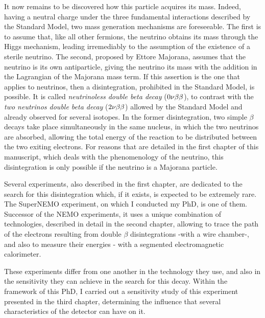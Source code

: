 It now remains to be discovered how this particle acquires its mass.
Indeed, having a neutral charge under the three fundamental interactions described by the Standard Model, two mass generation mechanisms are foreseeable.
The first is to assume that, like all other fermions, the neutrino obtains its mass through the Higgs mechanism, leading irremediably to the assumption of the existence of a sterile neutrino.
The second, proposed by Ettore Majorana, assumes that the neutrino is its own antiparticle, giving the neutrino its mass with the addition in the Lagrangian of the Majorana mass term.
If this assertion is the one that applies to neutrinos, then a disintegration, prohibited in the Standard Model, is possible.
It is called \emph{neutrinoless double beta decay} ($0\nu\beta\beta$), to contrast with the \emph{two neutrinos double beta decay} ($2\nu\beta\beta$) allowed by the Standard Model and already observed for several isotopes.
In the former disintegration, two simple $\beta$ decays take place simultaneously in the same nucleus, in which the two neutrinos are absorbed, allowing the total energy of the reaction to be distributed between the two exiting electrons.
For reasons that are detailed in the first chapter of this manuscript, which deals with the phenomenology of the neutrino, this disintegration is only possible if the neutrino is a Majorana particle.

Several experiments, also described in the first chapter, are dedicated to the search for this disintegration which, if it exists, is expected to be extremely rare.
The SuperNEMO experiment, on which I conducted my PhD, is one of them.
Successor of the NEMO experiments, it uses a unique combination of technologies, described in detail in the second chapter, allowing to trace the path of the electrons resulting from double $\beta$ disintegrations -with a wire chamber-, and also to measure their energies - with a segmented electromagnetic calorimeter.

These experiments differ from one another in the technology they use, and also in the sensitivity they can achieve in the search for this decay.
Within the framework of this PhD, I carried out a sensitivity study of this experiment presented in the third chapter, determining the influence that several characteristics of the detector can have on it.


